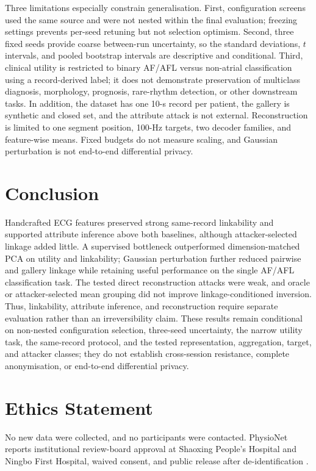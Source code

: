\documentclass[journal]{IEEEtran}
\begin{document}
Three limitations especially constrain generalisation. First, configuration
screens used the same source and were not nested within the final evaluation;
freezing settings prevents per-seed retuning but not selection optimism.
Second, three fixed seeds provide coarse between-run uncertainty, so the
standard deviations, $t$ intervals, and pooled bootstrap intervals are
descriptive and conditional. Third, clinical utility is restricted to binary
AF/AFL versus non-atrial classification using a record-derived label; it does
not demonstrate preservation of multiclass diagnosis, morphology, prognosis,
rare-rhythm detection, or other downstream tasks. In addition, the dataset has
one 10-s record per patient, the gallery is synthetic and closed set, and the
attribute attack is not external. Reconstruction is limited to one segment
position, 100-Hz targets, two decoder families, and feature-wise means. Fixed
budgets do not measure scaling, and Gaussian perturbation is not end-to-end
differential privacy.

\section{Conclusion}
\label{sec:conclusion}

Handcrafted ECG features preserved strong same-record linkability and
supported attribute inference above both baselines, although attacker-selected
linkage added little. A supervised bottleneck outperformed dimension-matched
PCA on utility and linkability; Gaussian perturbation further reduced pairwise
and gallery linkage while retaining useful performance on the single AF/AFL
classification task. The tested direct
reconstruction attacks were weak, and oracle or attacker-selected mean grouping
did not improve linkage-conditioned inversion. Thus, linkability, attribute
inference,
and reconstruction require separate evaluation rather than an irreversibility
claim. These results remain conditional on non-nested configuration selection,
three-seed uncertainty, the narrow utility task, the same-record protocol,
and the tested representation, aggregation, target, and attacker classes; they
do not establish
cross-session resistance, complete anonymisation, or end-to-end differential
privacy.


\section*{Ethics Statement}
No new data were collected, and no participants were contacted. PhysioNet
reports institutional review-board approval at Shaoxing People's Hospital and
Ningbo First Hospital, waived consent, and public release after de-identification
\cite{Zheng2022PhysioNetECG}.
\end{document}
